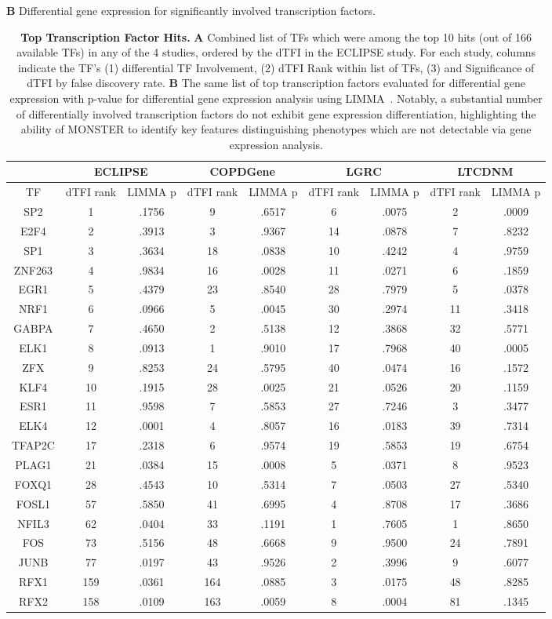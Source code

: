 \documentclass[9pt,twocolumn,twoside]{pnas-new}
\begin{document}
\begin{table}
\begin{widetext}
\textbf{B} Differential gene expression for significantly involved
transcription factors.

\begin{tabular}{|c||c|c||c|c||c|c||c|c|}
\cline{2-9} 
\multicolumn{1}{c|}{} & \multicolumn{2}{c||}{ECLIPSE} & \multicolumn{2}{c||}{COPDGene} & \multicolumn{2}{c||}{LGRC} & \multicolumn{2}{c|}{LTCDNM}\tabularnewline
\hline 
TF & dTFI rank & LIMMA p & dTFI rank & LIMMA p & dTFI rank & LIMMA p & dTFI rank & LIMMA p\tabularnewline
\hline 
\hline 
SP2 &  1 & .1756 &  9 & .6517 &  6 & .0075 &  2 & .0009\tabularnewline
\hline 
E2F4 &  2 & .3913 &  3 & .9367 & 14 & .0878 &  7 & .8232\tabularnewline
\hline 
SP1 &  3 & .3634 &  18 & .0838 & 10 & .4242 &  4 & .9759\tabularnewline
\hline 
ZNF263 &  4 & .9834 &  16 & .0028 & 11 & .0271 &  6 & .1859\tabularnewline
\hline 
EGR1 &  5 & .4379 &  23 & .8540 & 28 & .7979 &  5 & .0378\tabularnewline
\hline 
NRF1 &  6 & .0966 &  5 & .0045 & 30 & .2974 & 11 & .3418\tabularnewline
\hline 
GABPA &  7 & .4650 &  2 & .5138 & 12 & .3868 & 32 & .5771\tabularnewline
\hline 
ELK1 &  8 & .0913 &  1 & .9010 & 17 & .7968 & 40 & .0005\tabularnewline
\hline 
ZFX &  9 & .8253 &  24 & .5795 & 40 & .0474 & 16 & .1572\tabularnewline
\hline 
KLF4 &  10 & .1915 &  28 & .0025 & 21 & .0526 & 20 & .1159\tabularnewline
\hline 
ESR1 &  11 & .9598 &  7 & .5853 & 27 & .7246 &  3 & .3477\tabularnewline
\hline 
ELK4 &  12 & .0001 &  4 & .8057 & 16 & .0183 & 39 & .7314\tabularnewline
\hline 
TFAP2C &  17 & .2318 &  6 & .9574 & 19 & .5853 & 19 & .6754\tabularnewline
\hline 
PLAG1 &  21 & .0384 &  15 & .0008 &  5 & .0371 &  8 & .9523\tabularnewline
\hline 
FOXQ1 &  28 & .4543 &  10 & .5314 &  7 & .0503 & 27 & .5340\tabularnewline
\hline 
FOSL1 &  57 & .5850 &  41 & .6995 &  4 & .8708 & 17 & .3686\tabularnewline
\hline 
NFIL3 &  62 & .0404 &  33 & .1191 &  1 & .7605 &  1 & .8650\tabularnewline
\hline 
FOS &  73 & .5156 &  48 & .6668 &  9 & .9500 & 24 & .7891\tabularnewline
\hline 
JUNB &  77 & .0197 &  43 & .9526 &  2 & .3996 &  9 & .6077\tabularnewline
\hline 
RFX1 & 159 & .0361 & 164 & .0885 &  3 & .0175 & 48 & .8285\tabularnewline
\hline 
RFX2 & 158 & .0109 & 163 & .0059 &  8 & .0004 & 81 & .1345\tabularnewline
\hline 
\end{tabular}
\caption{\textbf{Top Transcription Factor Hits.} \textbf{A} Combined list of
TFs which were among the top 10 hits (out of 166 available TFs) in
any of the 4 studies, ordered by the dTFI in the ECLIPSE study. For
each study, columns indicate the TF's (1) differential TF Involvement,
(2) dTFI Rank within list of TFs, (3) and Significance of dTFI by
false discovery rate. \textbf{B} The same list of top transcription
factors evaluated for differential gene expression with p-value for
differential gene expression analysis using LIMMA~\cite{ritchie2015limma}.
Notably, a substantial number of differentially involved transcription
factors do not exhibit gene expression differentiation, highlighting
the ability of MONSTER to identify key features distinguishing phenotypes
which are not detectable via gene expression analysis.}
\end{widetext}
\end{table}



\end{document}
